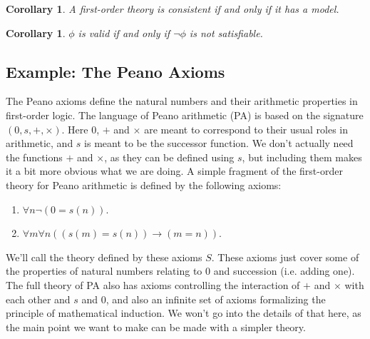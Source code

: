 \documentclass{article}
\theoremstyle{plain}
\newtheorem{corollary}[theorem]{Corollary}{\bfseries}{\upshape}
\theoremstyle{definition}
\newcommand{\ra}{\rightarrow}
\begin{document}
\begin{corollary}\label{C:cons}
A first-order theory is consistent if and only if it has a model.
\end{corollary}

\begin{corollary}\label{C:val}
$\phi$ is valid if and only if $\neg \phi$ is not satisfiable.
\end{corollary}


\subsection{Example: The Peano Axioms}\label{S:PA}
The Peano axioms define the natural numbers and their arithmetic properties in first-order logic. The language of Peano arithmetic (PA) is based on the signature $(0,s,+,\times)$. Here $0$, $+$ and $\times$ are meant to correspond to their usual roles in arithmetic, and $s$ is meant to be the successor function. We don't actually need the functions $+$ and $\times$, as they can be defined using $s$, but including them makes it a bit more obvious what we are doing. A simple fragment of the first-order theory for Peano arithmetic is defined by the following axioms:
\begin{enumerate}
\item $\forall n \neg (0 =s(n))$.
\item $\forall m\forall n((s(m)=s(n))\ra (m =n))$.
\end{enumerate}

We'll call the theory defined by these axioms $S$. These axioms just cover some of the properties of natural numbers relating to 0 and succession (i.e. adding one). The full theory of PA also has axioms controlling the interaction of $+$ and $\times$ with each other and $s$ and $0$, and also an infinite set of axioms formalizing the principle of mathematical induction. We won't go into the details of that here, as the main point we want to make can be made with a simpler theory.
\end{document}
